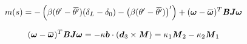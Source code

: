 \begin{equation}
	m(s) = - \left(\beta(\theta' -{\overbar{\theta'}})(\delta_L-\delta_0) - \left(\beta(\theta' -{\overbar{\theta'}})\right)'\right) + (\vect{\omega} - \overbar{\vect{\omega}})^T \mat{B} \mat{J}\vect{\omega}
\end{equation}

\begin{equation}
	(\vect{\omega} - \overbar{\vect{\omega}})^T \mat{B} \mat{J}\vect{\omega} 
	 = - \kappa\vect{b} \cdot (\vect{d}_3 \times \mat{M})
	 = \kappa_1 \mat{M}_2 -  \kappa_2 \mat{M}_1
\end{equation}



